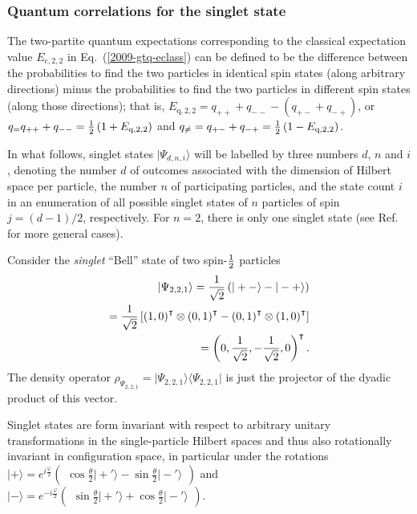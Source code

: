 \documentclass[%
  twocolumn,
 showpacs,
 showkeys,
 preprintnumbers,
 amsmath,amssymb,
 aps,
  pra,
  longbibliography,
 floatfix,
 ]{revtex4-1}
\begin{document}
\subsubsection{Quantum correlations for the singlet state}

The two-partite quantum expectations corresponding to the classical expectation value
$E_{\text{c},2,2}$ in Eq.~(\ref{2009-gtq-eclass})
can be defined to be the difference between the probabilities to
find the two particles in identical spin states (along arbitrary directions)
minus
the probabilities to
find the two particles in different spin states (along those directions);
that is,
$E_{\text{q},2,2}= q_{++} +q_{--} - (q_{+-} +q_{-+})$, or
$ q_{=} q_{++} +q_{--} =
{1\over2}\left(1 + E_{\text{q},2,2}  \right)
$
and
$
q_{\neq} =q_{+-} +q_{-+} =
{1\over2}\left(1 - E_{\text{q},2,2}  \right)
$.


In what follows, singlet states $\vert \Psi_{d,n,i} \rangle$ will be labelled by three numbers $d$, $n$ and $i$,
denoting
the number $d$ of outcomes associated with the dimension of Hilbert space per particle,
the number $n$ of participating particles,
and the state count $i$ in an enumeration of all possible singlet states of $n$ particles of spin $j=(d-1)/2$, respectively.
For $n=2$, there is only one singlet state
(see Ref.~\cite{schimpf-svozil} for more general cases).

Consider the {\em singlet} ``Bell'' state of two spin-${1\over 2}$
particles
\begin{equation}
\begin{split}
\vert \Psi_{2,2,1} \rangle
=
 {1\over \sqrt{2}}
\left(
\vert +- \rangle -
\vert -+ \rangle
\right)    \\
= {1\over \sqrt{2}}\left[ \left(1,0\right)^\intercal \otimes \left(0,1\right)^\intercal
- \left(0,1\right)^\intercal  \otimes \left(1,0\right)^\intercal \right]  \\
=\left( 0,\frac{1}{\sqrt{2}},- \frac{1}{\sqrt{2}} ,  0 \right)^\intercal
.
\end{split}  \label{2009-gtq-s1s21}
\end{equation}
The density operator $\rho_{\Psi_{2,2,1}} = \vert \Psi_{2,2,1} \rangle  \langle  \Psi_{2,2,1} \vert$
is just the projector of the dyadic product of this vector.


Singlet states are form invariant with respect to arbitrary unitary
transformations in the single-particle Hilbert spaces and thus
also rotationally invariant in configuration space,
in particular under the rotations~\cite[Eq.~(7--49)]{ba-89}
$
\vert + \rangle =
e^{ i{\frac{\varphi}{2}} }
\begin{pmatrix}
\cos \frac{\theta}{2} \vert +'  \rangle
-
\sin \frac{\theta}{2} \vert -'   \rangle
\end{pmatrix}
$
and
$
\vert - \rangle =
e^{ -i{\frac{\varphi}{2}} }
\begin{pmatrix}
\sin \frac{\theta}{2} \vert +'   \rangle
+
\cos \frac{\theta}{2} \vert -'  \rangle
\end{pmatrix}
$.
\end{document}
